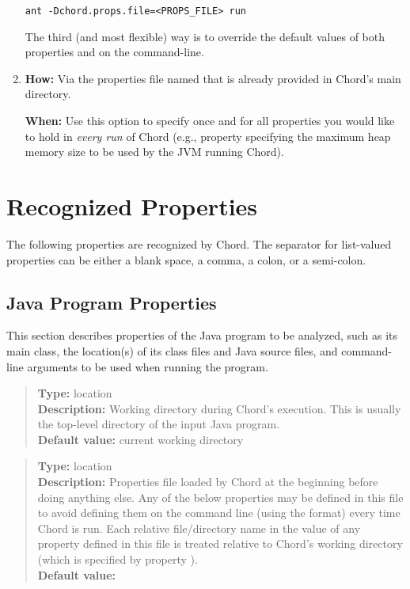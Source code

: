 \begin{enumerate}
\begin{framed}
\begin{verbatim}
ant -Dchord.props.file=<PROPS_FILE> run
\end{verbatim}
\end{framed}

The third (and most flexible) way is to override the default values of both properties 
and  on the command-line.


\item

{\bf How:} Via the properties file named  that is already provided in Chord's main directory.

{\bf When:} Use this option to specify once and for all properties you would
like to hold in {\it every run} of Chord (e.g., property 
specifying the maximum heap memory size to be used by the JVM running Chord).
\end{enumerate}

\section{Recognized Properties}
\label{sec:properties-meaning}

The following properties are recognized by Chord.
The separator for list-valued properties can be either a blank space, a comma, a colon, or a semi-colon.

\subsection{Java Program Properties} 
\label{sec:program-props}

This section describes properties of the Java program to be analyzed, such as
its main class, the location(s) of its class files and Java source
files, and command-line arguments to be used when running the program.

\begin{quote}
{\bf Type:} location \\
{\bf Description:} Working directory during Chord's execution.  This is
usually the top-level directory of the input Java program. \\
{\bf Default value:} current working directory
\end{quote}

\begin{quote}
{\bf Type:} location \\
{\bf Description:} Properties file loaded by Chord at the
beginning before doing anything else.  Any of the below properties may
be defined in this file to avoid defining them on the command line
(using the  format) every time Chord is run.
Each relative file/directory name in the value of any property defined
in this file is treated relative to Chord's working directory (which
is specified by property ). \\
{\bf Default value:} 
\end{quote}


